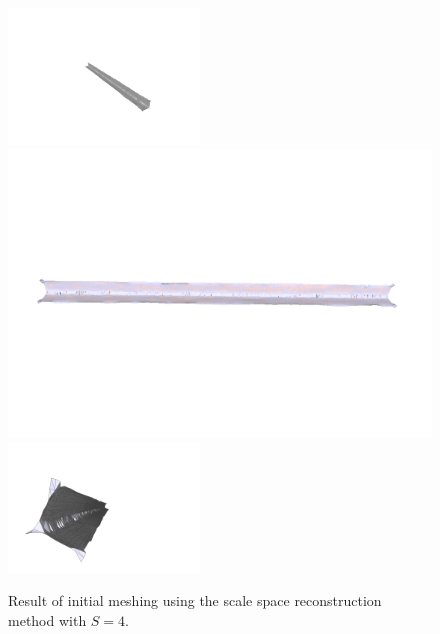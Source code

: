 \documentclass[12pt]{drexelthesis}
\begin{document}
\begin{figure}[!h]
	\label{zeronoise:scalespace4}
	\centering
		\includegraphics[trim={5in 2in 3in 3in},clip,width=2in]{simulated-lab-scan/0noise/clean/scalespace400.png}
		\includegraphics[width=6in]{simulated-lab-scan/0noise/clean/scalespace401.png}
		\includegraphics[trim={0.5in 1in 2in 2in}, clip, width=2in]{simulated-lab-scan/0noise/clean/scalespace402.png}
		\caption[Initial meshing using a scale space reconstruction with $S = 4$]{\centering  Result of initial meshing using the scale space reconstruction method with $S = 4$.}
\end{figure}
\end{document}
